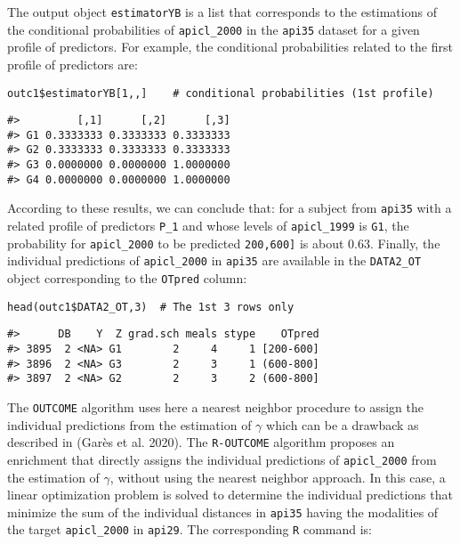 The output object \texttt{estimatorYB} is a list that corresponds to the estimations of the conditional probabilities of \texttt{apicl\_2000} in the \texttt{api35} dataset for a given profile of predictors. For example, the conditional probabilities related to the first profile of predictors are:

\begin{verbatim}
outc1$estimatorYB[1,,]    # conditional probabilities (1st profile)
\end{verbatim}

\begin{verbatim}
#>         [,1]      [,2]      [,3]
#> G1 0.3333333 0.3333333 0.3333333
#> G2 0.3333333 0.3333333 0.3333333
#> G3 0.0000000 0.0000000 1.0000000
#> G4 0.0000000 0.0000000 1.0000000
\end{verbatim}

According to these results, we can conclude that: for a subject from \texttt{api35} with a related profile of predictors \texttt{P\_1} and whose levels of \texttt{apicl\_1999} is \texttt{\textquotesingle{}G1\textquotesingle{}}, the probability for \texttt{apicl\_2000} to be predicted \texttt{\textquotesingle{}{[}200,600{]}\textquotesingle{}} is about \(0.63\). Finally, the individual predictions of \texttt{apicl\_2000} in \texttt{api35} are available in the \texttt{DATA2\_OT} object corresponding to the \texttt{OTpred} column:

\begin{verbatim}
head(outc1$DATA2_OT,3)  # The 1st 3 rows only
\end{verbatim}

\begin{verbatim}
#>      DB    Y  Z grad.sch meals stype    OTpred
#> 3895  2 <NA> G1        2     4     1 [200-600]
#> 3896  2 <NA> G3        2     3     1 (600-800]
#> 3897  2 <NA> G2        2     3     2 (600-800]
\end{verbatim}

The \texttt{OUTCOME} algorithm uses here a nearest neighbor procedure to assign the individual predictions from the estimation of \(\gamma\) which can be a drawback as described in (Garès et al. 2020). The \texttt{R-OUTCOME} algorithm proposes an enrichment that directly assigns the individual predictions of \texttt{apicl\_2000} from the estimation of \(\gamma\), without using the nearest neighbor approach. In this case, a linear optimization problem is solved to determine the individual predictions that minimize the sum of the individual distances in \texttt{api35} having the modalities of the target \texttt{apicl\_2000} in \texttt{api29}. The corresponding \texttt{R} command is:


